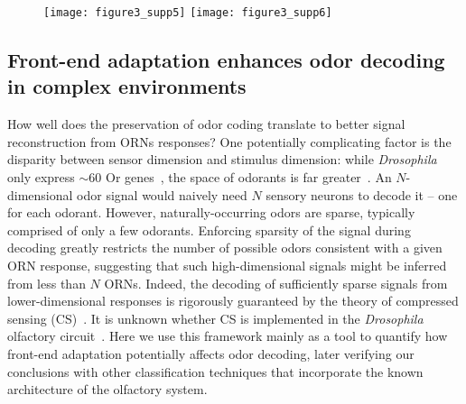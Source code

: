 \documentclass[9pt,lineno]{elife}
\begin{document}
\begin{figure}
\begin{fullwidth}
		{\texttt{[image: figure3\_supp5]}}
		\label{figsupp:SI_IHT_est}
		{\texttt{[image: figure3\_supp6]}}
		\label{figsupp:SI_odor_stats}
	\end{fullwidth}
\end{figure}


\subsection{Front-end adaptation enhances odor decoding in complex environments}

{\color{blue} 
How well does the preservation of odor coding  translate to better signal reconstruction from ORNs responses?
One potentially complicating factor is the disparity between sensor dimension and stimulus dimension: while \textit{Drosophila} only express $\sim 60$ Or genes~\citep{olfactory_sensory_map}, the space of odorants is far greater~\citep{vijay_1}. An $N$-dimensional odor signal would naively need $N$ sensory neurons to decode it -- one for each odorant. However, naturally-occurring odors are sparse, typically comprised of only a few odorants. Enforcing sparsity of the signal during decoding greatly restricts the number of possible odors consistent with a given ORN response, suggesting that such high-dimensional signals might be inferred from less than $N$ ORNs. Indeed, the decoding of sufficiently sparse signals from lower-dimensional responses is rigorously guaranteed by the theory of compressed sensing (CS)~\citep{CS_donoho, CS_tao}. }It is unknown whether CS is implemented in the \textit{Drosophila} olfactory circuit~\citep{chlovskii_pevlavan}. Here we use this framework mainly as a tool to quantify how front-end adaptation potentially affects odor decoding, later verifying our conclusions with other classification techniques that incorporate the known architecture of the olfactory system. 
\end{document}
